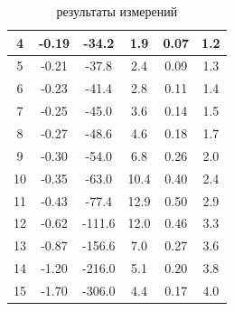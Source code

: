 \documentclass[a4paper,14pt]{article}
\begin{document}
\begin{table}[hbt!]
\begin{center}
\begin{tabular}{|c|c|c|c|c|c|}
4                & -0.19  & -34.2   & 1.9         & 0.07        & 1.2   \\ \hline
5                & -0.21  & -37.8   & 2.4         & 0.09        & 1.3   \\ \hline
6                & -0.23  & -41.4   & 2.8         & 0.11        & 1.4   \\ \hline
7                & -0.25  & -45.0   & 3.6         & 0.14        & 1.5   \\ \hline
8                & -0.27  & -48.6   & 4.6         & 0.18        & 1.7   \\ \hline
9                & -0.30  & -54.0   & 6.8         & 0.26        & 2.0   \\ \hline
10               & -0.35  & -63.0   & 10.4        & 0.40        & 2.4   \\ \hline
11               & -0.43  & -77.4   & 12.9        & 0.50        & 2.9   \\ \hline
12               & -0.62  & -111.6  & 12.0        & 0.46        & 3.3   \\ \hline
13               & -0.87  & -156.6  & 7.0         & 0.27        & 3.6   \\ \hline
14               & -1.20  & -216.0  & 5.1         & 0.20        & 3.8   \\ \hline
15               & -1.70  & -306.0  & 4.4         & 0.17        & 4.0   \\ \hline
	\end{tabular}
\caption{результаты измерений}
\label{tabb}
\end{center}
\end{table}

\clearpage
\end{document}
